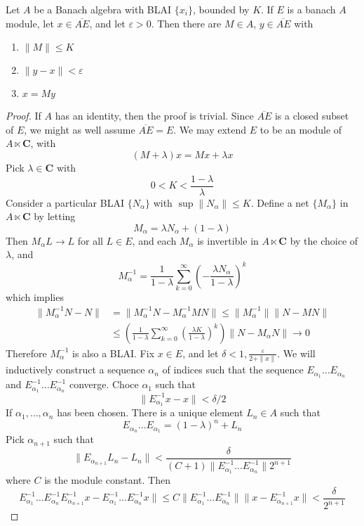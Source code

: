 \begin{theorem}
    Let $A$ be a Banach algebra with BLAI $\{ x_i \}$, bounded by $K$. If $E$ is a banach $A$ module, let $x \in \overline{AE}$, and let $\varepsilon > 0$. Then there are $M \in A$, $y \in \overline{AE}$ with
    \begin{enumerate}
        \item $\| M \| \leq K$
        \item $\| y - x \| < \varepsilon$
        \item $x = My$
    \end{enumerate}
\end{theorem}
\begin{proof}
    If $A$ has an identity, then the proof is trivial. Since $\overline{AE}$ is a closed subset of $E$, we might as well assume $\overline{AE} = E$. We may extend $E$ to be an module of $A \ltimes \mathbf{C}$, with
    \[ (M + \lambda) x = Mx + \lambda x \]
    Pick $\lambda \in \mathbf{C}$ with
    \[ 0 < K < \frac{1 - \lambda}{\lambda} \]
    Consider a particular BLAI $\{ N_\alpha \}$ with $\sup \| N_\alpha \| \leq K$. Define a net $\{ M_\alpha \}$ in $A \ltimes \mathbf{C}$ by letting
    \[ M_\alpha = \lambda N_\alpha + (1 - \lambda) \]
    Then $M_\alpha L \to L$ for all $L \in E$, and each $M_\alpha$ is invertible in $A \ltimes \mathbf{C}$ by the choice of $\lambda$, and
    \[ M_\alpha^{-1} = \frac{1}{1 - \lambda} \sum_{k = 0}^\infty \left(- \frac{\lambda N_\alpha}{1 - \lambda} \right)^k \]
    which implies
    \begin{align*}
        \| M_\alpha^{-1} N - N \| &= \| M_\alpha^{-1} N - M_\alpha^{-1} M N \| \leq \| M_\alpha^{-1} \| \| N - M N \|\\
        &\leq \left( \frac{1}{1 - \lambda} \sum_{k = 0}^\infty \left( \frac{\lambda K}{1 - \lambda} \right)^k \right) \| N - M_\alpha N \| \to 0
    \end{align*}
    Therefore $M_\alpha^{-1}$ is also a BLAI. Fix $x \in E$, and let $\delta < 1, \frac{\varepsilon}{2 + \|x\|}$. We will inductively construct a sequence $\alpha_n$ of indices such that the sequence $E_{\alpha_1} \dots E_{\alpha_n}$ and $E_{\alpha_1}^{-1} \dots E_{\alpha_n}^{-1}$ converge. Choce $\alpha_1$ such that
    \[ \| E_{\alpha_1}^{-1} x - x \| < \delta/2 \]
    If $\alpha_1, \dots, \alpha_n$ has been chosen. There is a unique element $L_n \in A$ such that
    \[  E_{\alpha_n} \dots E_{\alpha_1} = (1 - \lambda)^n + L_n \]
    Pick $\alpha_{n+1}$ such that
    \[ \| E_{\alpha_{n+1}} L_n - L_n \| < \frac{\delta}{(C + 1)\| E_{\alpha_1}^{-1} \dots E_{\alpha_n}^{-1} \| 2^{n+1}} \]
    where $C$ is the module constant. Then
    \[ E_{\alpha_1}^{-1} \dots E_{\alpha_n}^{-1} E_{\alpha_{n+1}}^{-1} x - E_{\alpha_1}^{-1} \dots E_{\alpha_n}^{-1} x \| \leq C \| E_{\alpha_1}^{-1} \dots E_{\alpha_n}^{-1} \| \| x - E_{\alpha_{n+1}}^{-1} x \| < \frac{\delta}{2^{n+1}} \]
\end{proof}

